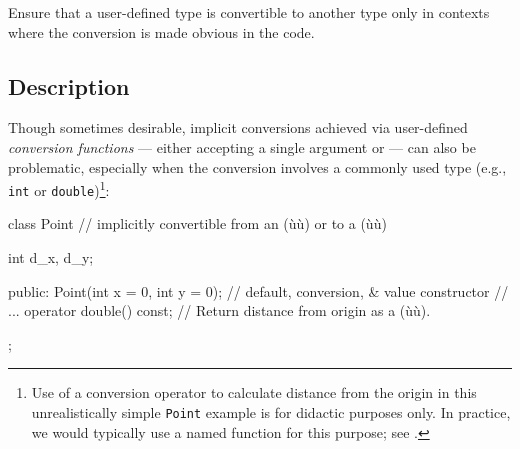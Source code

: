 
\setcounter{table}{0}
\setcounter{footnote}{0}
\setcounter{lstlisting}{0}

Ensure that a user-defined type is convertible to another type only in
contexts where the conversion is made obvious in the code.

\subsection[Description]{Description}\label{description-explicitconv}

Though sometimes desirable, implicit conversions achieved via user-defined \emph{conversion
functions} --- either  accepting a
single argument or  --- can also be problematic, especially when the
conversion involves a commonly used type (e.g., \lstinline!int! or
\lstinline!double!){\cprotect\footnote{Use of a conversion operator to
calculate distance from the origin in this unrealistically simple \lstinline!Point!
example is for didactic purposes only. In practice, we would typically
use a named function for this purpose; see .}}:

\begin{emcppslisting}[emcppsbatch=e1]
class Point  // implicitly convertible from an (ù{}ù) or to a (ù{}ù)
{
    int d_x, d_y;

public:
    Point(int x = 0, int y = 0);  // default, conversion, & value constructor
    // ...
    operator double() const;  // Return distance from origin as a (ù{}ù).
};
\end{emcppslisting}
    
